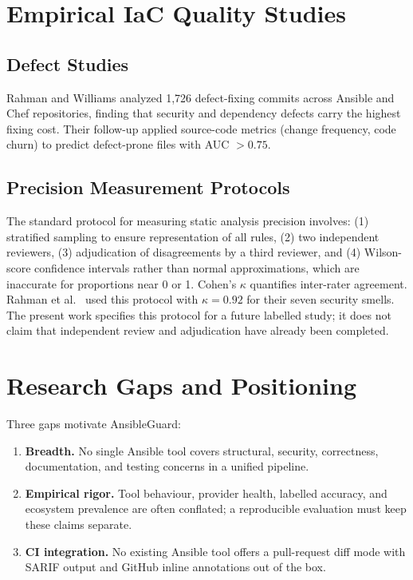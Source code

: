 \section{Empirical IaC Quality Studies}
\label{sec:empirical_bg}

\subsection{Defect Studies}

Rahman and Williams \cite{rahman2015iac} analyzed 1,726 defect-fixing commits
across Ansible and Chef repositories, finding that security and dependency
defects carry the highest fixing cost. Their follow-up \cite{rahman2020defective}
applied source-code metrics (change frequency, code churn) to predict defect-prone
files with AUC $> 0.75$.

\subsection{Precision Measurement Protocols}

The standard protocol for measuring static analysis precision involves:
(1) stratified sampling to ensure representation of all rules, (2) two
independent reviewers, (3) adjudication of disagreements by a third reviewer,
and (4) Wilson-score confidence intervals \cite{wilson1927probable} rather than
normal approximations, which are inaccurate for proportions near 0 or 1.
Cohen's $\kappa$ \cite{cohen1960kappa} quantifies inter-rater agreement. Rahman
et al.\ \cite{rahman2019security} used this protocol with $\kappa = 0.92$ for
their seven security smells. The present work specifies this protocol for a
future labelled study; it does not claim that independent review and
adjudication have already been completed.

\section{Research Gaps and Positioning}
\label{sec:gaps_bg}

\noindent
Three gaps motivate AnsibleGuard:

\begin{enumerate}
  \item \textbf{Breadth.} No single Ansible tool covers structural, security,
        correctness, documentation, and testing concerns in a unified pipeline.
  \item \textbf{Empirical rigor.} Tool behaviour, provider health, labelled
        accuracy, and ecosystem prevalence are often conflated; a reproducible
        evaluation must keep these claims separate.
  \item \textbf{CI integration.} No existing Ansible tool offers a pull-request
        diff mode with SARIF output and GitHub inline annotations out of the box.
\end{enumerate}

